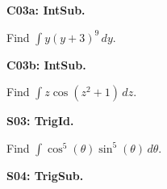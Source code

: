 \documentclass[12pt]{article}
\newcommand{\<}{\left\langle}
\renewcommand{\>}{\right\rangle}
\newcommand{\exerciseHeader}[4]{


  \vspace{0.5em}
  \textbf{#2}
  \vspace{0.5em}

}
\begin{document}
\begin{multicols}{2}
\exerciseHeader{2017 June 08}{C03a: IntSub.}{
Use integration by substitution.
}{1/4}

Find \(\int y(y+3)^9\,dy\).

\exerciseHeader{2017 June 08}{C03b: IntSub.}{
Use integration by substitution.
}{1/4}

Find \(\int z\cos(z^2+1)\,dz\).



%

%

%

%

\exerciseHeader{2017 June 14}{S03: TrigId.}{
Integrate products of trigonometric functions by applying trigonometric
identities.
}{3/3}

Find \(\int\cos^5(\theta)\sin^5(\theta)\,d\theta\).



%

%
%
%
%
%
%
\exerciseHeader{2017 June 15}{S04: TrigSub.}{
Use trigonometric substitution.
}{3/3}


\end{multicols}
\end{document}

